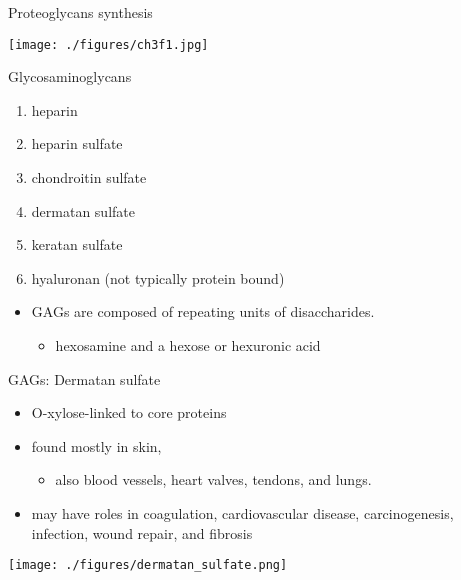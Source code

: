 \documentclass[presentation, smaller]{beamer}
\begin{document}
\begin{frame}[label={sec:org43daa8b}]{Proteoglycans synthesis}
\begin{center}
\texttt{[image: ./figures/ch3f1.jpg]}
\label{org7480fb9}
\end{center}
\end{frame}

\begin{frame}[label={sec:org605e97e}]{Glycosaminoglycans}
\begin{enumerate}
\item heparin
\item heparin sulfate
\item chondroitin sulfate
\item dermatan sulfate
\item keratan sulfate
\item hyaluronan (not typically protein bound)
\end{enumerate}


\begin{itemize}
\item GAGs are composed of repeating units of disaccharides.
\begin{itemize}
\item hexosamine and a hexose or hexuronic acid
\end{itemize}
\end{itemize}
\end{frame}

\begin{frame}[label={sec:orga369c3d}]{GAGs: Dermatan sulfate}
\begin{itemize}
\item O-xylose-linked to core proteins
\item found mostly in skin,
\begin{itemize}
\item also blood vessels, heart valves, tendons, and lungs.
\end{itemize}
\item may have roles in coagulation, cardiovascular disease, carcinogenesis, infection, wound repair, and fibrosis
\end{itemize}

\begin{center}
\texttt{[image: ./figures/dermatan\_sulfate.png]}
\label{org3f5b39b}
\end{center}
\end{frame}
\end{document}
